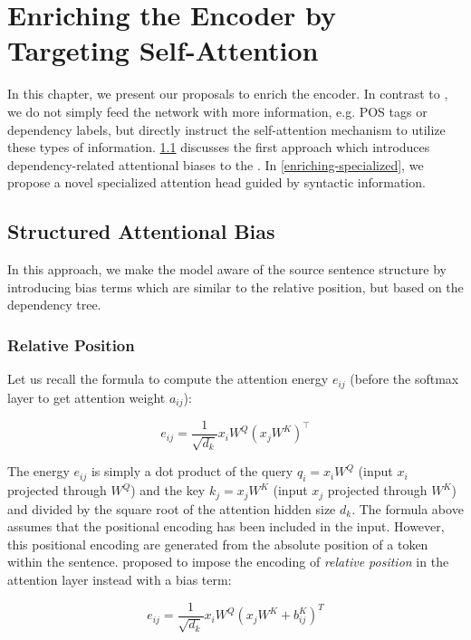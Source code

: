 \chapter{Enriching the Encoder by Targeting Self-Attention}
\label{enriching}

In this chapter, we present our proposals to enrich the encoder.
In contrast to \citeauthor{sennrich2016linguistic}, we do not simply feed the network with more information, e.g. POS tags or dependency labels, but directly instruct the self-attention mechanism to utilize these types of information. \cref{enriching-structure} discusses the first approach which introduces dependency-related attentional biases to the \transformer. In \cref{enriching-specialized}, we propose a novel specialized attention head guided by syntactic information.

\section{Structured Attentional Bias}
\label{enriching-structure}

In this approach, we make the \transformer model aware of the source sentence structure by introducing bias terms which are similar to the relative position, but based on the dependency tree.

\subsection{Relative Position}
\label{enriching-structure-relative}

Let us recall the formula to compute the attention energy $e_{ij}$ (before the softmax layer to get attention weight $a_{ij}$):

\[ e_{ij}=\frac{1}{\sqrt{d_k}} x_i W^Q (x_j W^K)^\intercal \]

The energy $e_{ij}$ is simply a dot product of the query $q_i=x_i W^Q$ (input $x_i$ projected through $W^Q$) and the key $k_j=x_j W^K$ (input $x_j$ projected through $W^K$) and divided by the square root of the attention hidden size $d_k$. The formula above assumes that the positional encoding has been included in the input. However, this positional encoding are generated from the absolute position of a token within the sentence. \cite{DBLP:conf/naacl/ShawUV18} proposed to impose the encoding of \textit{relative position} in the attention layer instead with a bias term:

\[ e_{ij}=\frac{1}{\sqrt{d_k}} x_i W^Q (x_j W^K + b^K_{ij})^T \]

